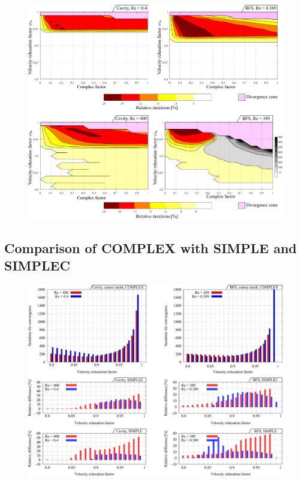 \documentclass[final,3p,times,10pt,onecolumn]{myElsarticle}
\numberwithin{equation}{section}
\begin{document}
\begin{figure}[t!]
\centering
\includegraphics[width=17cm]{fig/Results/FactorLowRe.pdf}
\caption{}
\label{Fig:FactorLowRe}
\end{figure}

\subsection{Comparison of COMPLEX with SIMPLE and SIMPLEC}

\begin{figure}[t!]
\centering
\includegraphics[width=17cm]{fig/Results/complexCoarse.pdf}
\caption{}
\label{Fig:complexCoarse}
\end{figure}
\end{document}
